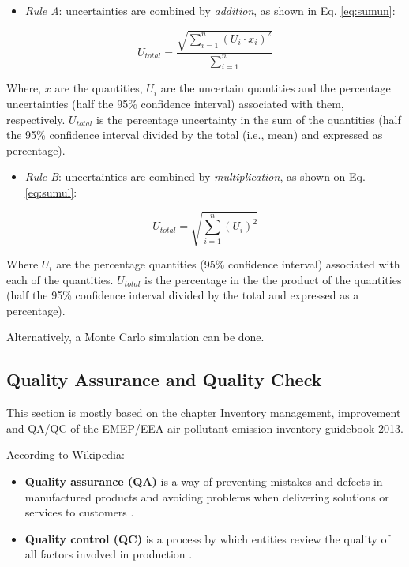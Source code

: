 \documentclass[12pt,graybox,envcountchap,sectrefs]{krantz}
\providecommand{\tightlist}{%
  \setlength{\itemsep}{0pt}\setlength{\parskip}{0pt}}
\theoremstyle{definition}
\theoremstyle{definition}
\theoremstyle{definition}
\theoremstyle{remark}
\begin{document}
\begin{itemize}
\tightlist
\item
  \emph{Rule A}: uncertainties are combined by \emph{addition}, as shown
  in Eq. \eqref{eq:sumun}:
\end{itemize}

\begin{equation}
U_{total}=\frac{\sqrt{\sum_{i = 1}^{n}(U_i \cdot x_i )^2}}{\sum_{i = 1}^{n}}
\label{eq:sumun}
\end{equation}

Where, \(x\) are the quantities, \(U_i\) are the uncertain quantities
and the percentage uncertainties (half the 95\% confidence interval)
associated with them, respectively. \(U_{total}\) is the percentage
uncertainty in the sum of the quantities (half the 95\% confidence
interval divided by the total (i.e., mean) and expressed as percentage).

\begin{itemize}
\tightlist
\item
  \emph{Rule B}: uncertainties are combined by \emph{multiplication}, as
  shown on Eq. \eqref{eq:sumul}:
\end{itemize}

\begin{equation}
U_{total}=\sqrt{\sum_{i = 1}^{n}(U_i)^2} 
\label{eq:sumul}
\end{equation}

Where \(U_i\) are the percentage quantities (95\% confidence interval)
associated with each of the quantities. \(U_{total}\) is the percentage
in the the product of the quantities (half the 95\% confidence interval
divided by the total and expressed as a percentage).

Alternatively, a Monte Carlo simulation can be done.

\subsection{Quality Assurance and Quality
Check}\label{quality-assurance-and-quality-check}

This section is mostly based on the chapter Inventory management,
improvement and QA/QC \citep{guiaqa} of the EMEP/EEA air pollutant
emission inventory guidebook 2013.

According to Wikipedia:

\begin{itemize}
\tightlist
\item
  \textbf{Quality assurance (QA)} is a way of preventing mistakes and
  defects in manufactured products and avoiding problems when delivering
  solutions or services to customers \citep{wiki:qa}.
\item
  \textbf{Quality control (QC)} is a process by which entities review
  the quality of all factors involved in production \citep{wiki:qc}.
\end{itemize}
\end{document}
